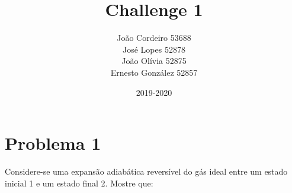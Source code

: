 \documentclass[12pt, twoside, a4paper]{article}
\begin{document}
\title{Challenge 1}
\author{João Cordeiro 53688\\José Lopes 52878\\João Olívia 52875\\Ernesto González 52857}
\date{2019-2020}
\maketitle

\section{Problema 1}
Considere-se uma expansão adiabática reversível do gás ideal entre um estado inicial 1 e um estado final 2. Mostre que:
\end{document}
